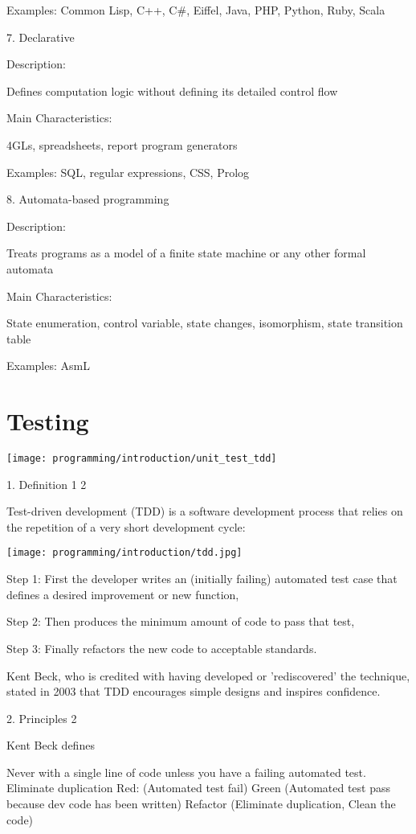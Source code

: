 Examples: Common Lisp, C++, C#, Eiffel, Java, PHP, Python, Ruby, Scala

7. Declarative

Description:

Defines computation logic without defining its detailed control flow

Main Characteristics:

4GLs, spreadsheets, report program generators

Examples: SQL, regular expressions, CSS, Prolog

8. Automata-based programming

Description:

Treats programs as a model of a finite state machine or any other formal automata

Main Characteristics:

State enumeration, control variable, state changes, isomorphism, state transition table

Examples: AsmL

\section{Testing}

\texttt{[image: programming/introduction/unit\_test\_tdd]}

1. Definition 1 2

Test-driven development (TDD) is a software development process that relies on the repetition of a very short development cycle:

\texttt{[image: programming/introduction/tdd.jpg]}

Step 1: First the developer writes an (initially failing) automated test case that defines a desired improvement or new function,

Step 2: Then produces the minimum amount of code to pass that test,

Step 3: Finally refactors the new code to acceptable standards.

Kent Beck, who is credited with having developed or 'rediscovered' the technique, stated in 2003 that TDD encourages simple designs and inspires confidence.

2. Principles 2

Kent Beck defines

Never with a single line of code unless you have a failing automated test.
Eliminate duplication
Red: (Automated test fail) Green (Automated test pass because dev code has been written) Refactor (Eliminate duplication, Clean the code)

